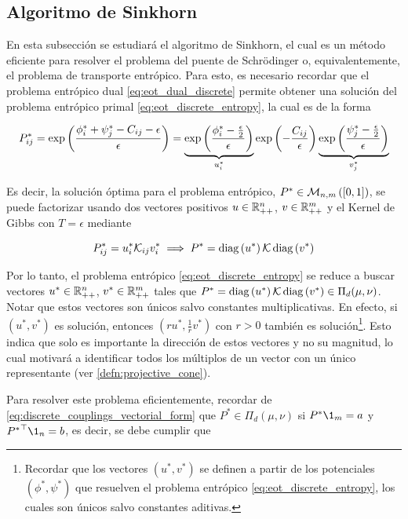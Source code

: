 \subsection{Algoritmo de Sinkhorn}
\label{eot_sbp/static_sbp/sinkhorn}

En esta subsección se estudiará el algoritmo de Sinkhorn, el cual es un método eficiente para resolver el problema del puente de Schrödinger o, equivalentemente, el problema de transporte entrópico. Para esto, es necesario recordar que el problema entrópico dual \eqref{eq:eot_dual_discrete} permite obtener una solución del problema entrópico primal \eqref{eq:eot_discrete_entropy}, la cual es de la forma

\begin{equation}
	\label{eq:sinkhorn_decomposition}
	P_{ij}^* = \exp\left(\frac{\phi_i^* + \psi_j^* - C_{ij} - \epsilon}{\epsilon}\right)
	= \underbrace{\exp\left(\frac{\phi^*_i-\frac{\epsilon}{2}}{\epsilon}\right)}_{u^*_i}
	\exp\left(-\frac{C_{ij}}{\epsilon}\right)
	\underbrace{\exp\left(\frac{\psi^*_j-\frac{\epsilon}{2}}{\epsilon}\right)}_{v^*_j}
\end{equation}

Es decir, la solución óptima para el problema entrópico, $P^*\in\mathcal{M}_{n,m}\left([0,1]\right)$, se puede factorizar usando dos vectores positivos $u\in\mathbb{R}^n_{++}$, $v\in\mathbb{R}^m_{++}$ y el Kernel de Gibbs con $T=\epsilon$ mediante

\begin{equation*}
	P_{ij}^* = u^*_i \mathcal{K}_{ij} v^*_i \implies P^* = \operatorname{diag}\left(u^*\right)\mathcal{K}\operatorname{diag}\left(v^*\right)
\end{equation*}

Por lo tanto, el problema entrópico \eqref{eq:eot_discrete_entropy} se reduce a buscar vectores $u^*\in\mathbb{R}^n_{++}$, $v^*\in\mathbb{R}^m_{++}$ tales que $P^* = \operatorname{diag}\left(u^*\right)\mathcal{K}\operatorname{diag}\left(v^*\right)\in\Pi_d(\mu,\nu)$. Notar que estos vectores son únicos salvo constantes multiplicativas. En efecto, si $(u^*,v^*)$ es solución, entonces $(ru^*, \frac{1}{r}v^*)$ con $r>0$ también es solución\footnote{Recordar que los vectores $(u^*,v^*)$ se definen a partir de los potenciales $(\phi^*,\psi^*)$ que resuelven el problema entrópico \eqref{eq:eot_discrete_entropy}, los cuales son únicos salvo constantes aditivas.}. Esto indica que solo es importante la dirección de estos vectores y no su magnitud, lo cual motivará a identificar todos los múltiplos de un vector con un único representante (ver \autoref{defn:projective_cone}).

Para resolver este problema eficientemente, recordar de \eqref{eq:discrete_couplings_vectorial_form} que $P^*\in\Pi_d(\mu,\nu)$ si $P^*\1_m = a$ y ${P^*}^\top \1_n = b$, es decir, se debe cumplir que


